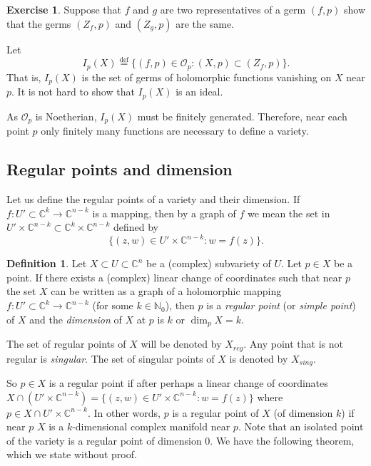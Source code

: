 \documentclass[12pt,openany]{book}
\newcommand{\C}{{\mathbb{C}}}
\newcommand{\N}{{\mathbb{N}}}
\newcommand{\sO}{{\mathcal{O}}}
\newcommand{\myindex}[1]{#1\index{#1}}
\theoremstyle{plain}
\theoremstyle{remark}
\theoremstyle{definition}
\newtheorem{defn}[thm]{Definition}
\theoremstyle{exercise}
\newtheorem{exercise}{Exercise}[section]
\theoremstyle{example}
\begin{document}
\begin{exercise}
Suppose that $f$ and $g$ are two representatives of a germ $(f,p)$
show that the germs $(Z_f,p)$ and $(Z_g,p)$ are the same.
\end{exercise}

Let
\begin{equation}
I_p(X) \overset{\text{def}}{=}
\{ (f,p) \in \sO_p : (X,p) \subset (Z_f,p) \} .
\end{equation}
That is, $I_p(X)$ is the set of germs of holomorphic functions vanishing on
$X$ near $p$.  It is not hard to show that $I_p(X)$ is an ideal.

As $\sO_p$ is Noetherian, $I_p(X)$ must be finitely
generated.  Therefore, near each point $p$ only finitely many functions are
necessary to define a variety.

\subsection{Regular points and dimension}

Let us define the
regular points of a variety and their dimension.
If $f \colon U' \subset \C^k \to \C^{n-k}$ is a mapping, then
by a graph of $f$ we mean the set in $U' \times \C^{n-k} \subset \C^k \times
\C^{n-k}$ defined by
\begin{equation}
\{ (z,w) \in U' \times \C^{n-k} : w=f(z) \} .
\end{equation}

\begin{defn}
Let $X \subset U \subset \C^n$ be a (complex) subvariety of $U$.  Let $p \in X$ be a
point.  If there exists a (complex)
linear change of coordinates such that near
$p$ the set $X$ can be written as a graph of a holomorphic
mapping $f \colon U' \subset \C^k \to
\C^{n-k}$ (for some $k \in \N_0$), then $p$ is a \emph{\myindex{regular point}} (or
\emph{\myindex{simple point}}) of $X$ and
the \emph{dimension}
of $X$ at $p$ is $k$ or $\dim_p X = k$.

The set of regular points of $X$ will be denoted by $X_{\mathit{reg}}$.  Any
point that is not regular is \emph{singular}.
The set of singular points of $X$ is denoted by $X_{\mathit{sing}}$.
\end{defn}

So $p \in X$ is a regular point if after perhaps a linear
change of coordinates $X \cap (U' \times \C^{n-k})
=
\{ (z,w) \in U' \times \C^{n-k} : w=f(z) \}$ where $p \in 
X \cap U' \times \C^{n-k}$.
In other words, $p$ is a regular point of $X$ (of dimension $k$) if near $p$
$X$ is a $k$-dimensional complex manifold near $p$.  Note that
an isolated point of the variety
is a regular point of dimension 0.
We have the following theorem, which we
state without proof.
\end{document}
